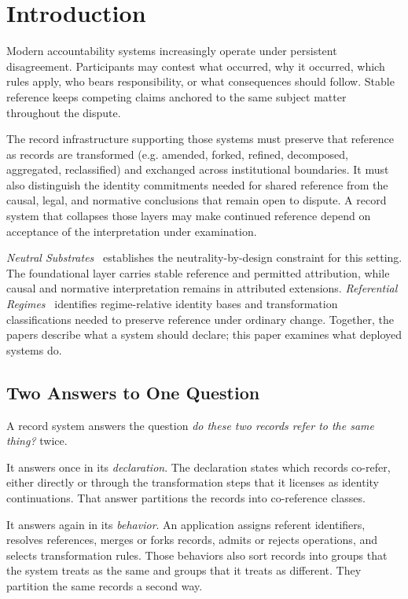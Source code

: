 \documentclass[11pt]{article}
\theoremstyle{plain}
\theoremstyle{definition}
\theoremstyle{remark}
\begin{document}
\section{Introduction}
\label{oi.sec.intro}

Modern accountability systems increasingly operate under persistent disagreement.
Participants may contest what occurred, why it occurred,
which rules apply, who bears responsibility, or what consequences should follow.
Stable reference keeps competing claims anchored to the same subject matter throughout the dispute.

The record infrastructure supporting those systems must preserve that reference
as records are transformed (e.g. amended, forked, refined, decomposed, aggregated, reclassified)
and exchanged across institutional boundaries.
It must also distinguish the identity commitments needed for shared reference
from the causal, legal, and normative conclusions that remain open to dispute.
A record system that collapses those layers may make continued reference depend
on acceptance of the interpretation under examination.

\emph{Neutral Substrates}~\citep{case2026neutral}
establishes the neutrality-by-design constraint for this setting.
The foundational layer carries stable reference and permitted attribution,
while causal and normative interpretation remains in attributed extensions.
\emph{Referential Regimes}~\citep{case2026referential}
identifies regime-relative identity bases and transformation classifications
needed to preserve reference under ordinary change.
Together, the papers describe what a system should declare;
this paper examines what deployed systems do.

\subsection{Two Answers to One Question}

A record system answers the question
\emph{do these two records refer to the same thing?}
twice.

It answers once in its \emph{declaration}.
The declaration states which records co-refer,
either directly or through the transformation steps
that it licenses as identity continuations.
That answer partitions the records into co-reference classes.

It answers again in its \emph{behavior}.
An application assigns referent identifiers,
resolves references, merges or forks records,
admits or rejects operations, and selects transformation rules.
Those behaviors also sort records into
groups that the system treats as the same
and groups that it treats as different.
They partition the same records a second way.
\end{document}
